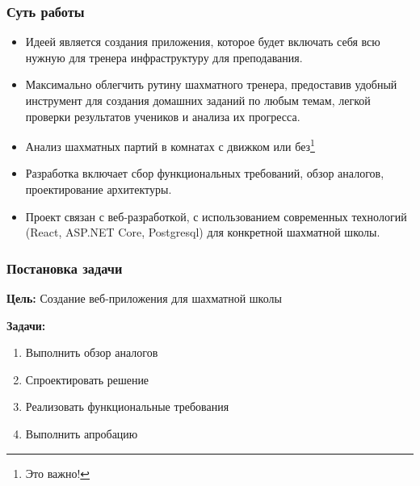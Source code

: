 \documentclass{vkr-slides-style}
\begin{document}
\makeslidestitle



\begin{frame}  
    \frametitle{Суть работы}
    \begin{itemize}
        \item Идеей является создания приложения, которое будет включать себя всю нужную для тренера инфраструктуру для преподавания.

        \item Максимально облегчить рутину шахматного тренера, предоставив удобный инструмент для создания домашних заданий по любым темам, легкой проверки результатов учеников и анализа их прогресса.
        
        \item Анализ шахматных партий в комнатах с движком или без\footnote{Это важно!}
        
        \item Разработка включает сбор функциональных требований, обзор аналогов, проектирование архитектуры.
        
        \item Проект связан с веб-разработкой, с использованием современных технологий (React, ASP.NET Core, Postgresql) для конкретной шахматной школы.
    \end{itemize}
\end{frame}


\begin{frame}  
    \frametitle{Постановка задачи}
    \textbf{Цель:} Создание веб-приложения для шахматной школы

    \vspace{5mm}
    \textbf{Задачи:}
    \begin{enumerate}
        \item Выполнить обзор аналогов
        \item Спроектировать решение
        \item Реализовать функциональные требования
        \item Выполнить апробацию
    \end{enumerate}
\end{frame}
\end{document}
